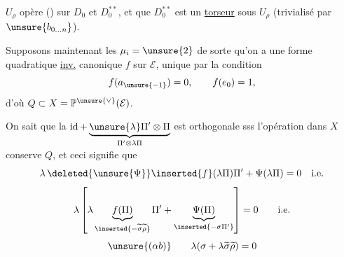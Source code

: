$U_\rho$ opère () sur $D_0$ et $D_0^{**}$,
et que $D_0^{**}$ est un \uline{torseur} sous $U_\rho$
(trivialisé par $\unsure{b_{0\ldots n}}$).


Supposons maintenant les $\mu_i=\unsure{2}$ de sorte qu'on a une forme quadratique
\uline{inv.} canonique $f$ sur $\mathcal E$, unique par la condition
\[
f(a_{\unsure{-1}})=0,\qquad f(e_0)=1,
\]
d'où $Q\subset X=\mathbb P^{\unsure{\vee}}(\mathcal E)$.

On sait que la 
$\operatorname{id}+\underbrace{\unsure{\lambda}\Pi'\otimes\Pi}_{\Pi'\otimes\lambda\Pi}$
est  orthogonale sss l'opération 
dans $X$ conserve $Q$, et ceci signifie que
\[
\lambda\,\deleted{\unsure{\Psi}}\inserted{f}(\lambda\Pi)\Pi'
+\Psi(\lambda\Pi)=0\quad\text{i.e.}
\]
\[
\lambda\left[
\lambda\underbrace{f(\Pi)}_{\inserted{-\widetilde\sigma\widetilde\rho}}\Pi'
+\underbrace{\Psi(\Pi)}_{\inserted{-\sigma\Pi'}}
\right]=0\qquad\text{i.e.}
\]
\[
\unsure{(\alpha b)}\qquad
\lambda(\sigma+\lambda\widetilde\sigma\widetilde\rho)=0
\]

